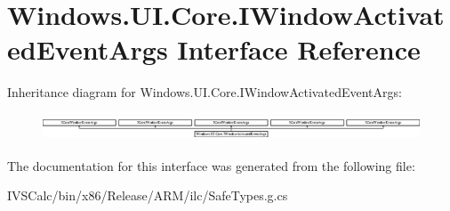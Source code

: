\hypertarget{interface_windows_1_1_u_i_1_1_core_1_1_i_window_activated_event_args}{}\section{Windows.\+U\+I.\+Core.\+I\+Window\+Activated\+Event\+Args Interface Reference}
\label{interface_windows_1_1_u_i_1_1_core_1_1_i_window_activated_event_args}
Inheritance diagram for Windows.\+U\+I.\+Core.\+I\+Window\+Activated\+Event\+Args\+:\begin{figure}[H]
\begin{center}
\leavevmode
\includegraphics[height=0.800000cm]{interface_windows_1_1_u_i_1_1_core_1_1_i_window_activated_event_args}
\end{center}
\end{figure}


The documentation for this interface was generated from the following file\+:\begin{DoxyCompactItemize}
\item 
I\+V\+S\+Calc/bin/x86/\+Release/\+A\+R\+M/ilc/Safe\+Types.\+g.\+cs\end{DoxyCompactItemize}
